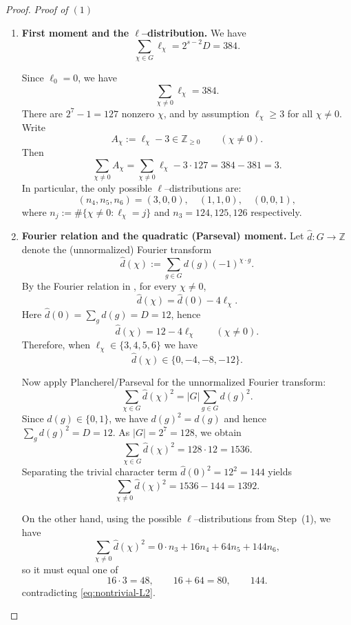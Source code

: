 \documentclass[12pt,twoside,]{amsart}
\theoremstyle{plain}
\theoremstyle{definition}
\begin{document}
\begin{proof}
\noindent\textit{Proof of $(1)$}
\begin{enumerate}
\item \textbf{First moment and the $\ell$--distribution.}
We have
\begin{equation}\label{eq:first-moment}
\sum_{\chi\in G}\ell_\chi = 2^{s-2}D = 384.
\end{equation}

Since $\ell_0=0$, we have
\[
\sum_{\chi\neq 0}\ell_\chi=384.
\]
There are $2^7-1=127$ nonzero $\chi$, and by assumption $\ell_\chi\ge 3$ for all
$\chi\neq 0$. Write
\[
A_\chi := \ell_\chi-3 \in \mathbb Z_{\ge 0}\qquad (\chi\neq 0).
\]
Then
\[
\sum_{\chi\neq 0} A_\chi
=
\sum_{\chi\neq 0}\ell_\chi - 3\cdot 127
=
384-381
=
3.
\]
In particular, the only possible
$\ell$--distributions are:
\[
(n_4,n_5,n_6)=(3,0,0),\quad (1,1,0),\quad (0,0,1),
\]
where $n_j:=\#\{\chi\neq 0:\ell_\chi=j\}$ and $n_3 = 124, 125, 126$ respectively.

\item \textbf{Fourier relation and the quadratic (Parseval) moment.}
Let $\widehat d:G\to \mathbb Z$ denote the (unnormalized) Fourier transform
\[
\widehat d(\chi):=\sum_{g\in G} d(g)(-1)^{\chi\cdot g}.
\]
By the Fourier relation in , for every $\chi\neq 0$,
\begin{equation}\label{eq:fourier-relation}
\widehat d(\chi)=\widehat d(0)-4\ell_\chi.
\end{equation}
Here $\widehat d(0)=\sum_{g} d(g)=D=12$, hence
\[
\widehat d(\chi)=12-4\ell_\chi
\qquad (\chi\neq 0).
\]
Therefore, when $\ell_\chi\in\{3,4,5,6\}$ we have
\[
\widehat d(\chi)\in\{0,-4,-8,-12\}.
\]

Now apply Plancherel/Parseval for the unnormalized Fourier transform:
\[
\sum_{\chi\in G}\widehat d(\chi)^2
=
|G|\sum_{g\in G} d(g)^2.
\]
Since $d(g)\in\{0,1\}$, we have $d(g)^2=d(g)$ and hence $\sum_g d(g)^2=D=12$.
As $|G|=2^7=128$, we obtain
\[
\sum_{\chi\in G}\widehat d(\chi)^2 = 128\cdot 12=1536.
\]
Separating the trivial character term $\widehat d(0)^2=12^2=144$ yields
\begin{equation}\label{eq:nontrivial-L2}
\sum_{\chi\neq 0}\widehat d(\chi)^2 = 1536-144=1392.
\end{equation}

On the other hand, using the possible $\ell$--distributions from Step~(1), we have
\[
\sum_{\chi\neq 0}\widehat d(\chi)^2
=
0\cdot n_3 + 16 n_4 + 64 n_5 + 144 n_6,
\]
so it must equal one of
\[
16\cdot 3=48,\qquad 16+64=80,\qquad 144.
\]
contradicting \eqref{eq:nontrivial-L2}.
\end{enumerate}


\end{proof}
\end{document}
